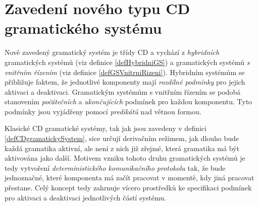 


\section{Zavedení nového typu CD gramatického systému} \label{nadpisZavedeniNovehoGS}

Nově zavedený gramatický systém je třídy CD a vychází z \emph{hybridních} gramatických systémů (viz definice \ref{defHybridniGS}) a gramatických
systémů \emph{s vnitřním řízením} (viz definice \ref{defGSVnitrniRizeni}). Hybridním systémům se přibližuje faktem, že jednotlivé komponenty mají
\emph{rozdílné podmínky} pro jejich aktivaci a deaktivaci. Gramatickým systémům s vnitřním řízením se podobá stanovením \emph{počátečních} a \emph{ukončujících} podmínek pro každou komponentu.
Tyto podmínky jsou vyjádřeny pomocí \emph{predikátů} nad větnou formou.

Klasické CD gramatické systémy, tak jak jsou zavedeny v definici \ref{defCDgramatickySystem}, sice určují derivačním režimem, jak dlouho bude každá gramatika aktivní, ale není z nich již zřejmé, která
gramatika má být aktivována jako další.
Motivem vzniku tohoto druhu gramatických systémů je tedy vytvoření \emph{deterministického komunikačního protokolu} tak, že bude jednoznačné, které komponenta má začít pracovat v momentě,
kdy jiná pracovat přestane. Celý koncept tedy zahrnuje vícero prostředků ke specifikaci podmínek pro aktivaci a deaktivaci jednotlivých částí systému.

